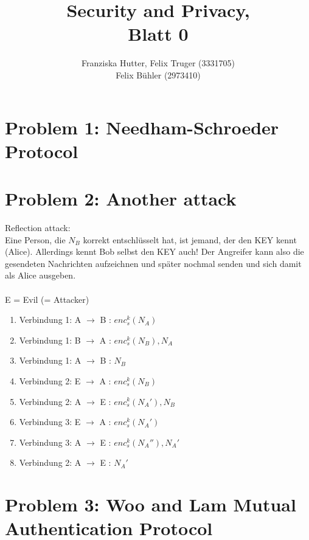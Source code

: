 \documentclass[12pt,pdftex,a4paper]{article}
\title{Security and Privacy,\\ Blatt 0}
\author{Franziska Hutter, Felix Truger (3331705)\\
	Felix Bühler (2973410)}
\newcommand\tab[1][1cm]{\hspace*{#1}}
\begin{document}
\maketitle
\pagebreak

\section*{Problem 1: Needham-Schroeder Protocol}

\section*{Problem 2: Another attack}
Reflection attack:\\
Eine Person, die $ N_B $ korrekt entschlüsselt hat, ist jemand, der den KEY kennt (Alice). Allerdings kennt Bob selbst den KEY auch! Der Angreifer kann also die gesendeten Nachrichten aufzeichnen und später nochmal senden und sich damit als Alice ausgeben.
\\~\\
E = Evil (= Attacker)
\begin{enumerate}
	\item Verbindung 1: A $ \rightarrow $ B \tab : $ enc_s^k(N_A) $
	\item Verbindung 1: B $ \rightarrow $ A \tab : $ enc_s^k(N_B), N_A $
	\item Verbindung 1: A $ \rightarrow $ B \tab : $ N_B $
	\setlength{\itemsep}{20pt}
	\item Verbindung 2: E $ \rightarrow $ A \tab : $ enc_s^k(N_B) $
	\setlength{\itemsep}{5pt}
	\item Verbindung 2: A $ \rightarrow $ E \tab : $ enc_s^k(N_A'), N_B $
	\item Verbindung 3: E $ \rightarrow $ A \tab : $ enc_s^k(N_A') $
	\item Verbindung 3: A $ \rightarrow $ E \tab : $ enc_s^k(N_A''), N_A' $
	\item Verbindung 2: A $ \rightarrow $ E \tab : $ N_A' $
\end{enumerate}
\section*{Problem 3: Woo and Lam Mutual Authentication Protocol}
\end{document}
